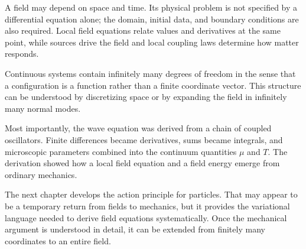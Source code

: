 A field may depend on space and time. Its physical problem is not specified by a differential equation alone; the domain, initial data, and boundary conditions are also required. Local field equations relate values and derivatives at the same point, while sources drive the field and local coupling laws determine how matter responds.

Continuous systems contain infinitely many degrees of freedom in the sense that a configuration is a function rather than a finite coordinate vector. This structure can be understood by discretizing space or by expanding the field in infinitely many normal modes.

Most importantly, the wave equation was derived from a chain of coupled oscillators. Finite differences became derivatives, sums became integrals, and microscopic parameters combined into the continuum quantities \(\mu\) and \(T\). The derivation showed how a local field equation and a field energy emerge from ordinary mechanics.

The next chapter develops the action principle for particles. That may appear to be a temporary return from fields to mechanics, but it provides the variational language needed to derive field equations systematically. Once the mechanical argument is understood in detail, it can be extended from finitely many coordinates to an entire field.